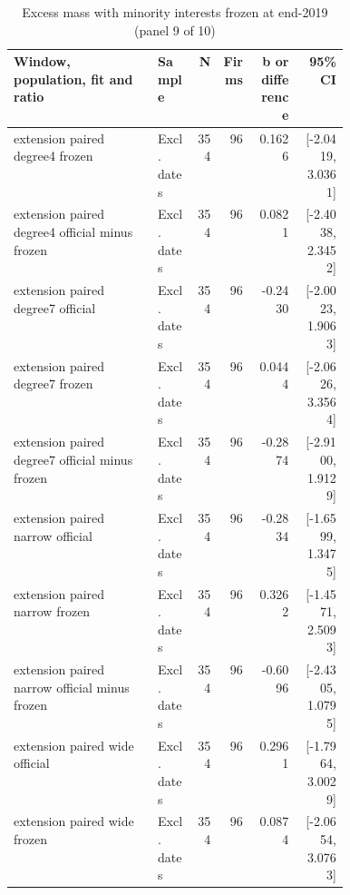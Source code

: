 \begin{table}[!htbp]\centering\scriptsize
\caption{Excess mass with minority interests frozen at end-2019 (panel 9 of 10)}
\begin{threeparttable}
\begin{tabular}{p{0.43\linewidth}lrrrr}
\toprule
Window, population, fit and ratio & Sample & N & Firms & b or difference & 95\% CI \\
\midrule
extension paired degree4 frozen & Excl. dates & 354 & 96 & 0.1626 & [-2.0419, 3.0361] \\
extension paired degree4 official minus frozen & Excl. dates & 354 & 96 & 0.0821 & [-2.4038, 2.3452] \\
extension paired degree7 official & Excl. dates & 354 & 96 & -0.2430 & [-2.0023, 1.9063] \\
extension paired degree7 frozen & Excl. dates & 354 & 96 & 0.0444 & [-2.0626, 3.3564] \\
extension paired degree7 official minus frozen & Excl. dates & 354 & 96 & -0.2874 & [-2.9100, 1.9129] \\
extension paired narrow official & Excl. dates & 354 & 96 & -0.2834 & [-1.6599, 1.3475] \\
extension paired narrow frozen & Excl. dates & 354 & 96 & 0.3262 & [-1.4571, 2.5093] \\
extension paired narrow official minus frozen & Excl. dates & 354 & 96 & -0.6096 & [-2.4305, 1.0795] \\
extension paired wide official & Excl. dates & 354 & 96 & 0.2961 & [-1.7964, 3.0029] \\
extension paired wide frozen & Excl. dates & 354 & 96 & 0.0874 & [-2.0654, 3.0763] \\
\bottomrule
\end{tabular}
\begin{tablenotes}[flushleft]\footnotesize

\end{tablenotes}
\end{threeparttable}
\end{table}
